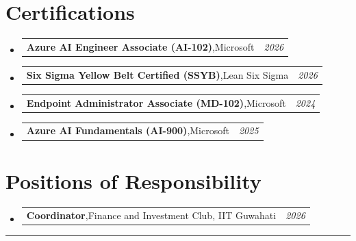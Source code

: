 \documentclass[a4paper,11pt]{article}
\makeatletter
\newcommand{\resumePOR}[3]{
\vspace{0.5mm}\item
    \begin{tabular*}{0.97\textwidth}[t]{l@{\extracolsep{\fill}}r}
        \textbf{#1},\hspace{0.3mm}#2 & \textit{\small{#3}} 
    \end{tabular*}
    \vspace{-2mm}
}
\newcommand{\resumeSubHeadingListStart}{\begin{itemize}[leftmargin=*,labelsep=0mm]}
\newcommand{\resumeSubHeadingListEnd}{\end{itemize}\vspace{2mm}}
\makeatother
\begin{document}
\section{Certifications}
\vspace{-0.2mm}
\resumeSubHeadingListStart
\resumePOR{Azure AI Engineer Associate (AI-102)}{Microsoft}{2026}
\resumePOR{Six Sigma Yellow Belt Certified (SSYB)}{Lean Six Sigma}{2026}
\resumePOR{Endpoint Administrator Associate (MD-102)}{Microsoft}{2024}
\resumePOR{Azure AI Fundamentals (AI-900)}{Microsoft}{2025}
\resumeSubHeadingListEnd
\vspace{-4mm}

\section{Positions of Responsibility}
\vspace{-0.4mm}
\resumeSubHeadingListStart
\resumePOR{Coordinator}{Finance and Investment Club, IIT Guwahati}{2026}
\resumeSubHeadingListEnd
\hspace*{-5mm}\rule{1.035\textwidth}{0.1mm}
\end{document}
